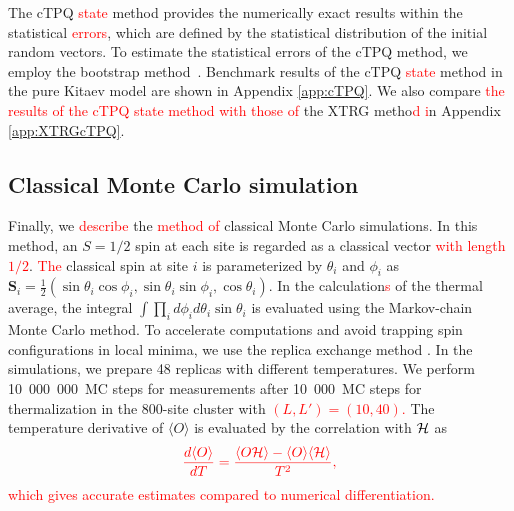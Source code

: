 \documentclass[twocolumn,superscriptaddress,showpacs, longbibliography, aps, prb]{revtex4-2}
\newcommand{\red}[1]{\textcolor{red}{#1}}
\newcommand{\blue}[1]{\textcolor{blue}{#1}}
\newcommand{\orange}[1]{\textcolor{orange}{#1}}
\begin{document}
The cTPQ \red{state} method %
provides the numerically exact
results within the statistical %
\red{errors},
which are defined by the statistical distribution of the initial random vectors.
To %
estimate the statistical errors %
of the cTPQ method, 
we employ the bootstrap method~\cite{HPhi_v2}.
Benchmark results of the cTPQ \red{state} method in the pure Kitaev model are 
shown in Appendix \ref{app:cTPQ}. We also %
compare %
\red{the results of the cTPQ state method with those of} the XTRG metho\red{d %
i}n Appendix \ref{app:XTRGcTPQ}.

\subsection{Classical Monte Carlo simulation}\label{subsec:Classical Monte Carlo simulation}
Finally, we %
\red{describe} the \red{method of} classical Monte Carlo simulations.
In this method, an $S=1/2$ spin at each site is regarded as a classical vector \red{with length $1/2$}.
\red{The} classical spin at site $i$ is parameterized by $\theta_i$ and $\phi_i$ as
$\bm{S}_i = \frac{1}{2}(\sin\theta_i\cos\phi_i, \sin\theta_i\sin\phi_i, \cos\theta_i)$.
In the calculation\red{s} of the thermal average, the integral $\int \prod_i d\phi_i d\theta_i \sin\theta_i$ is evaluated %
using the Markov-chain Monte Carlo method.
To accelerate %
computations and avoid trapping %
spin configurations %
in local minima, we use the replica exchange method \cite{Hukushima1996}.
In the simulations, we prepare 48 replicas with different temperatures.
We perform 10~000~000~MC steps for measurements after 10~000~MC steps for thermalization in the 800-site cluster with %
\red{$(L, L') = (10, 40)$.} 
The temperature derivative of $\langle O \rangle$ is evaluated by the correlation with ${\cal H}$ as  %
\begin{align}
\red{\frac{d\langle O \rangle}%
{dT}=\frac{%
\langle O %
{\cal H}\rangle -\langle O %
\rangle \langle {\cal H}\rangle} %
{T^2},} %
\end{align}
\red{which gives accurate estimates compared to numerical differentiation.} 
\end{document}
